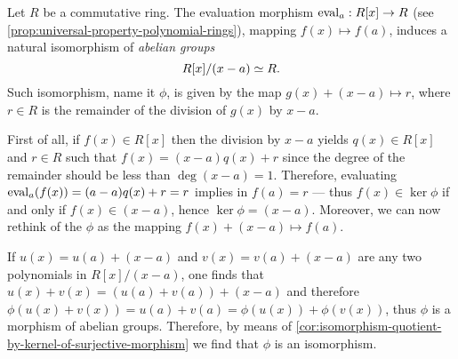 \begin{example}[Evaluation]
    \label{exp:evaluation-induces-isomorphism}
    Let \(R\) be a commutative ring. The evaluation morphism \(\operatorname{eval}_a: R[x] \to R\)
    (see \cref{prop:universal-property-polynomial-rings}), mapping
    \(f(x) \mapsto f(a)\), induces a natural isomorphism of \emph{abelian groups}
    \[
        R[x]/(x - a) \simeq R.
    \]
    Such isomorphism, name it \(\phi\), is given by the map
    \(g(x) + (x - a) \mapsto r\), where \(r \in R\) is the remainder of the division
    of \(g(x)\) by \(x - a\).

    First of all, if \(f(x) \in R[x]\) then the division by \(x - a\) yields
    \(q(x) \in R[x]\) and \(r \in R\) such that \(f(x) = (x - a) q(x) + r\) since
    the degree of the remainder should be less than \(\deg(x - a) = 1\). Therefore,
    evaluating \(\operatorname{eval}_{a}(f(x)) = (a - a) q(x) + r = r\) implies in \(f(a) = r\)
    --- thus \(f(x) \in \ker \phi\) if and only if \(f(x) \in (x - a)\), hence
    \(\ker \phi = (x - a)\). Moreover, we can now rethink of the \(\phi\) as the
    mapping \(f(x) + (x - a) \mapsto f(a)\).

    If \(u(x) = u(a) + (x - a)\) and \(v(x) = v(a) + (x - a)\) are any two
    polynomials in \(R[x]/(x - a)\), one finds that
    \(u(x) + v(x) = (u(a) + v(a)) + (x - a)\) and therefore \(\phi(u(x) + v(x)) =
    u(a) + v(a) = \phi(u(x)) + \phi(v(x))\), thus \(\phi\) is a morphism of abelian
    groups. Therefore, by means of
    \cref{cor:isomorphism-quotient-by-kernel-of-surjective-morphism} we find that
    \(\phi\) is an isomorphism.
\end{example}

